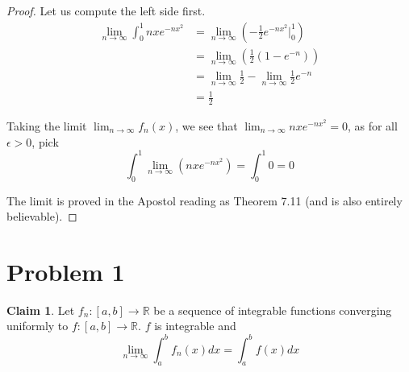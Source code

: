 \documentclass[12pt,letterpaper]{article}
\theoremstyle{definition}
\newtheorem*{claim}{Claim}
\newcommand{\R}{\mathbb{R}}
\begin{document}
\begin{proof}
  Let us compute the left side first.
  \begin{align*}
    \lim_{n\rightarrow \infty}\int_0^1nxe^{-nx^2} &= \lim_{n\rightarrow \infty}\left( -\frac{1}{2}e^{-nx^2} \Big|^1_0 \right) \\
                                                  &= \lim_{n\rightarrow \infty}\left( \frac{1}{2}(1 - e^{-n}) \right) \\
                                                  &= \lim_{n\rightarrow \infty} \frac{1}{2} - \lim_{n\rightarrow \infty} \frac{1}{2}e^{-n} \\
                                                  &= \frac{1}{2}
  \end{align*}
  
  Taking the limit $\lim_{n\rightarrow \infty}f_n(x)$, we see that
  $\lim_{n\rightarrow \infty} nxe^{-nx^2} = 0$, as for all $\epsilon > 0$, pick
  \[
    \int_0^1 \lim_{n\rightarrow \infty}\left( nxe^{-nx^2} \right) = \int_0^1  0 = 0
  \]

  The limit is proved in the Apostol reading as Theorem 7.11 (and is also
  entirely believable).
\end{proof}

\section*{Problem 1}

\begin{claim}
  Let $f_n:[a,b] \rightarrow \R$ be a sequence of integrable functions
  converging uniformly to $f: [a,b] \rightarrow \R$. $f$ is integrable and
  \[
    \lim_{n\rightarrow \infty} \int_a^b f_n(x)dx = \int_a^bf(x)dx
  \]
\end{claim}
\end{document}
